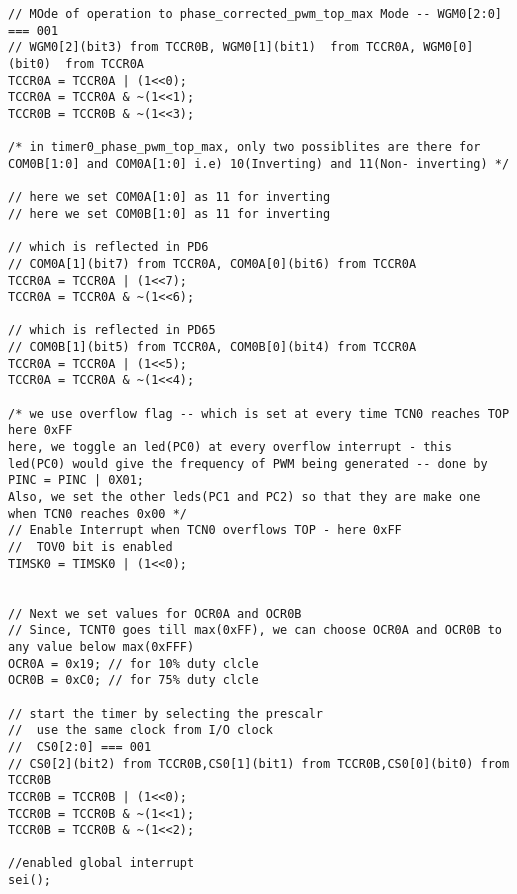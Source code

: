 \begin{verbatim}
// MOde of operation to phase_corrected_pwm_top_max Mode -- WGM0[2:0] === 001
// WGM0[2](bit3) from TCCR0B, WGM0[1](bit1)  from TCCR0A, WGM0[0](bit0)  from TCCR0A
TCCR0A = TCCR0A | (1<<0);
TCCR0A = TCCR0A & ~(1<<1);
TCCR0B = TCCR0B & ~(1<<3);	

/* in timer0_phase_pwm_top_max, only two possiblites are there for COM0B[1:0] and COM0A[1:0] i.e) 10(Inverting) and 11(Non- inverting) */

// here we set COM0A[1:0] as 11 for inverting
// here we set COM0B[1:0] as 11 for inverting

// which is reflected in PD6
// COM0A[1](bit7) from TCCR0A, COM0A[0](bit6) from TCCR0A
TCCR0A = TCCR0A | (1<<7);
TCCR0A = TCCR0A & ~(1<<6);

// which is reflected in PD65
// COM0B[1](bit5) from TCCR0A, COM0B[0](bit4) from TCCR0A
TCCR0A = TCCR0A | (1<<5);
TCCR0A = TCCR0A & ~(1<<4);

/* we use overflow flag -- which is set at every time TCN0 reaches TOP here 0xFF
here, we toggle an led(PC0) at every overflow interrupt - this led(PC0) would give the frequency of PWM being generated -- done by PINC = PINC | 0X01;
Also, we set the other leds(PC1 and PC2) so that they are make one when TCN0 reaches 0x00 */
// Enable Interrupt when TCN0 overflows TOP - here 0xFF
//  TOV0 bit is enabled
TIMSK0 = TIMSK0 | (1<<0);


// Next we set values for OCR0A and OCR0B
// Since, TCNT0 goes till max(0xFF), we can choose OCR0A and OCR0B to any value below max(0xFFF)
OCR0A = 0x19; // for 10% duty clcle
OCR0B = 0xC0; // for 75% duty clcle

// start the timer by selecting the prescalr
//  use the same clock from I/O clock
//  CS0[2:0] === 001
// CS0[2](bit2) from TCCR0B,CS0[1](bit1) from TCCR0B,CS0[0](bit0) from TCCR0B
TCCR0B = TCCR0B | (1<<0);
TCCR0B = TCCR0B & ~(1<<1);
TCCR0B = TCCR0B & ~(1<<2);

//enabled global interrupt
sei();
\end{verbatim}


